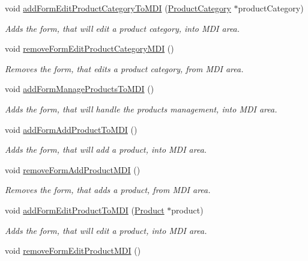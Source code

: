 \begin{DoxyCompactItemize}
void \hyperlink{class_main_window_a8d47f21d3ece04d2a791782c10f7c336}{add\-Form\-Edit\-Product\-Category\-To\-M\-D\-I} (\hyperlink{class_product_category}{\-Product\-Category} $\ast$product\-Category)
\begin{DoxyCompactList}\small\item\em \-Adds the form, that will edit a product category, into \-M\-D\-I area. \end{DoxyCompactList}\item 
void \hyperlink{class_main_window_a2e94bb4802d8fa4f21d8975481febca4}{remove\-Form\-Edit\-Product\-Category\-M\-D\-I} ()
\begin{DoxyCompactList}\small\item\em \-Removes the form, that edits a product category, from \-M\-D\-I area. \end{DoxyCompactList}\item 
void \hyperlink{class_main_window_a311d00ab9d1311d0d4b87fcb21929805}{add\-Form\-Manage\-Products\-To\-M\-D\-I} ()
\begin{DoxyCompactList}\small\item\em \-Adds the form, that will handle the products management, into \-M\-D\-I area. \end{DoxyCompactList}\item 
void \hyperlink{class_main_window_ab84647f8038b270fcda039c00cc1f041}{add\-Form\-Add\-Product\-To\-M\-D\-I} ()
\begin{DoxyCompactList}\small\item\em \-Adds the form, that will add a product, into \-M\-D\-I area. \end{DoxyCompactList}\item 
void \hyperlink{class_main_window_ac13860f71e6a7d580a4da2a0f551ad22}{remove\-Form\-Add\-Product\-M\-D\-I} ()
\begin{DoxyCompactList}\small\item\em \-Removes the form, that adds a product, from \-M\-D\-I area. \end{DoxyCompactList}\item 
void \hyperlink{class_main_window_a0f021de03c672261a8bb36e6113dea3a}{add\-Form\-Edit\-Product\-To\-M\-D\-I} (\hyperlink{class_product}{\-Product} $\ast$product)
\begin{DoxyCompactList}\small\item\em \-Adds the form, that will edit a product, into \-M\-D\-I area. \end{DoxyCompactList}\item 
void \hyperlink{class_main_window_a2fc6fa78aee375c467c79d90559be17c}{remove\-Form\-Edit\-Product\-M\-D\-I} ()

\end{DoxyCompactItemize}
